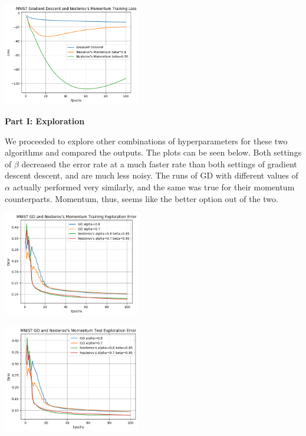\documentclass[10pt]{article}
\begin{document}
\begin{multicols}{2}
\begin{center}
\end{center}
\begin{center}
    \includegraphics[width=0.45\textwidth]{GradientDescentandNesterov'sMomentumTrainingLoss.png}
\end{center}
\noindent
\textbf{Part I: Exploration} \par
We proceeded to explore other combinations of hyperparameters for these two algorithms and compared the outputs. The plots can be seen below. Both settings of $\beta$ decreased the error rate at a much faster rate than both settings of gradient descent descent, and are much less noisy. The runs of GD with different values of $\alpha$ actually performed very similarly, and the same was true for their momentum counterparts. Momentum, thus, seems like the better option out of the two.\par
\begin{center}
    \includegraphics[width=0.45\textwidth]{GDandNesterov'sMomentumTrainingExplorationError.png}
\end{center}
\begin{center}
    \includegraphics[width=0.45\textwidth]{GDandNesterov'sMomentumTestExplorationError.png}

\end{center}
\end{multicols}
\end{document}
